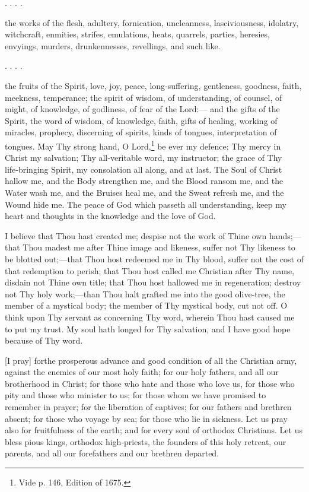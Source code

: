 
. . . .

the works of the flesh, adultery, fornication, uncleanness, lasciviousness, idolatry, witchcraft, enmities, strifes, emulations, heats, quarrels, parties, heresies, envyings, murders, drunkennesses, revellings, and such like.

. . . .

the fruits of the Spirit, love, joy, peace, long‑suffering, gentleness, goodness, faith, meekness, temperance; the spirit of wisdom, of understanding, of counsel, of might, of knowledge, of godliness, of fear of the Lord:— and the gifts of the Spirit, the word of wisdom, of knowledge, faith, gifts of healing, working of miracles, prophecy, discerning of spirits, kinds of tongues, interpretation of tongues. May Thy strong hand, O Lord,\footnote{Vide p. 146, Edition of 1675.} be ever my defence; Thy mercy in Christ my salvation; Thy all‑veritable word, my instructor; the grace of Thy life‑bringing Spirit, my consolation all along, and at last. The Soul of Christ hallow me, and the Body strengthen me, and the Blood ransom me, and the Water wash me, and the Bruises heal me, and the Sweat refresh me, and the Wound hide me. The peace of God which passeth all understanding, keep my heart and thoughts in the knowledge and the love of God.


I believe that Thou hast created me; despise not the work of Thine own hands;— that Thou madest me after Thine image and likeness, suffer not Thy likeness to be blotted out;—that Thou host redeemed me in Thy blood, suffer not the cost of that redemption to perish; that Thou host called me Christian after Thy name, disdain not Thine own title; that Thou host hallowed me in regeneration; destroy not Thy holy work;—than Thou halt grafted me into the good olive‑tree, the member of a mystical body; the member of Thy mystical body, cut not off.  O think upon Thy servant as concerning Thy word, wherein Thou hast caused me to put my trust. My soul hath longed for Thy salvation, and I have good hope because of Thy word.

[I pray] forthe prosperous advance and good condition of all the Christian army, against the enemies of our most holy faith; for our holy fathers, and all our brotherhood in Christ; for those who hate and those who love us, for those who pity and those who minister to us; for those whom we have promised to remember in prayer; for the liberation of captives; for our fathers and brethren absent; for those who voyage by sea; for those who lie in sickness. Let us pray also for fruitfulness of the earth; and for every soul of orthodox Christians. Let us bless pious kings, orthodox high‑priests, the founders of this holy retreat, our parents, and all our forefathers and our brethren departed.

